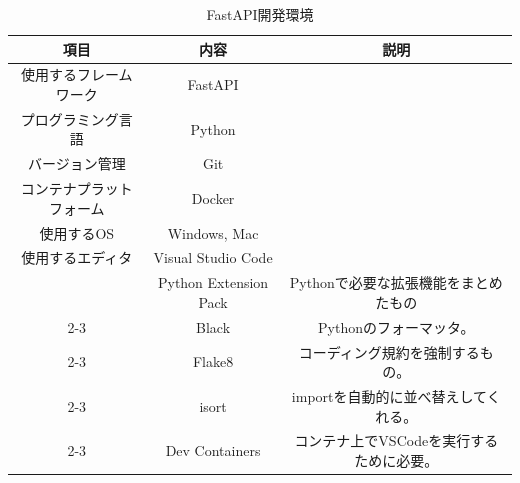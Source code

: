 \begin{table}[H]
  \centering
  \caption{FastAPI開発環境}
  \label{tab:development-fastapi}
  \begin{tabular}{|c|c|c|}
    \hline
    \rowcolor[HTML]{C0C0C0}
    項目                     & 内容                    & 説明                      \\ \hline
    使用するフレームワーク            & FastAPI               &                         \\ \hline
    プログラミング言語              & Python                &                         \\ \hline
    バージョン管理                & Git                   &                         \\ \hline
    コンテナプラットフォーム           & Docker                &                         \\ \hline
    使用するOS                 & Windows, Mac          &                         \\ \hline
    使用するエディタ               & Visual Studio Code    &                         \\ \hline
                           & Python Extension Pack & Pythonで必要な拡張機能をまとめたもの   \\ \cline{2-3}
                           & Black                 & Pythonのフォーマッタ。          \\ \cline{2-3}
                           & Flake8                & コーディング規約を強制するもの。        \\ \cline{2-3}
                           & isort                 & importを自動的に並べ替えしてくれる。   \\ \cline{2-3}
    \multirow{-5}{*}{拡張機能} & Dev Containers        & コンテナ上でVSCodeを実行するために必要。 \\ \hline
  \end{tabular}
\end{table}